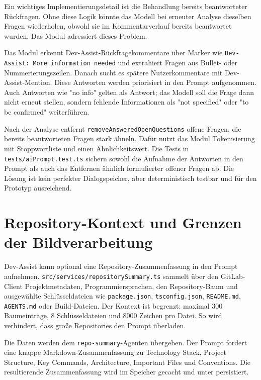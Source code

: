 \documentclass[12pt,a4paper,oneside]{scrreprt}
\begin{document}
Ein wichtiges Implementierungsdetail ist die Behandlung bereits beantworteter Rückfragen. Ohne diese Logik könnte das Modell bei erneuter Analyse dieselben Fragen wiederholen, obwohl sie im Kommentarverlauf bereits beantwortet wurden. Das Modul  adressiert dieses Problem.

Das Modul erkennt Dev-Assist-Rückfragekommentare über Marker wie \texttt{Dev-Assist: More information needed} und extrahiert Fragen aus Bullet- oder Nummerierungszeilen. Danach sucht es spätere Nutzerkommentare mit Dev-Assist-Mention. Diese Antworten werden priorisiert in den Prompt aufgenommen. Auch Antworten wie "no info" gelten als Antwort; das Modell soll die Frage dann nicht erneut stellen, sondern fehlende Informationen als "not specified" oder "to be confirmed" weiterführen.

Nach der Analyse entfernt \texttt{removeAnsweredOpenQuestions} offene Fragen, die bereits beantworteten Fragen stark ähneln. Dafür nutzt das Modul Tokenisierung mit Stoppwortliste und einen Ähnlichkeitswert. Die Tests in \texttt{tests/aiPrompt.test.ts} sichern sowohl die Aufnahme der Antworten in den Prompt als auch das Entfernen ähnlich formulierter offener Fragen ab. Die Lösung ist kein perfekter Dialogspeicher, aber deterministisch testbar und für den Prototyp ausreichend.

\section{Repository-Kontext und Grenzen der Bildverarbeitung}

Dev-Assist kann optional eine Repository-Zusammenfassung in den Prompt aufnehmen. \texttt{src/services/repositorySummary.ts} sammelt über den GitLab-Client Projektmetadaten, Programmiersprachen, den Repository-Baum und ausgewählte Schlüsseldateien wie \texttt{package.json}, \texttt{tsconfig.json}, \texttt{README.md}, \texttt{AGENTS.md} oder Build-Dateien. Der Kontext ist begrenzt: maximal 300 Baumeinträge, 8 Schlüsseldateien und 8000 Zeichen pro Datei. So wird verhindert, dass große Repositories den Prompt überladen.

Die Daten werden dem \texttt{repo-summary}-Agenten übergeben. Der Prompt fordert eine knappe Markdown-Zusammenfassung zu Technology Stack, Project Structure, Key Commands, Architecture, Important Files und Conventions. Die resultierende Zusammenfassung wird im Speicher gecacht und unter  persistiert.
\end{document}
